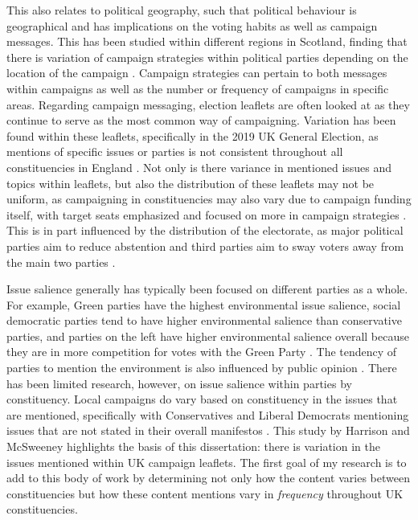 \documentclass[preprint]{elsarticle} %
\begin{document}
This also relates to political geography, such that political behaviour is geographical and has implications on the voting habits as well as campaign messages. This has been studied within different regions in Scotland, finding that there is variation of campaign strategies within political parties depending on the location of the campaign \citep{pringleClassicsHumanGeography2003,agasosterPartyCohesionLocal2001}. Campaign strategies can pertain to both messages within campaigns as well as the number or frequency of campaigns in specific areas. Regarding campaign messaging, election leaflets are often looked at as they continue to serve as the most common way of campaigning. Variation has been found within these leaflets, specifically in the 2019 UK General Election, as mentions of specific issues or parties is not consistent throughout all constituencies in England  \citep{trummParliamentaryCandidatesTheir2023a}. Not only is there variance in mentioned issues and topics within leaflets, but also the distribution of these leaflets may not be uniform, as campaigning in constituencies may also vary due to campaign funding itself, with target seats emphasized and focused on more in campaign strategies \citep{pattieResourcingConstituencyCampaign2016}. This is in part influenced by the distribution of the electorate, as major political parties aim to reduce abstention and third parties aim to sway voters away from the main two parties \citep{nunezEffectsLocalCampaigning2021}.

Issue salience generally has typically been focused on different parties as a whole. For example, Green parties have the highest environmental issue salience, social democratic parties tend to have higher environmental salience than conservative parties, and parties on the left have higher environmental salience overall because they are in more competition for votes with the Green Party \citep{carterGreeningMainstreamParty2013}. The tendency of parties to mention the environment is also influenced by public opinion \citep{carterPartyPoliticizationEnvironment2006}. There has been limited research, however, on issue salience within parties by constituency. Local campaigns do vary based on constituency in the issues that are mentioned, specifically with Conservatives and Liberal Democrats mentioning issues that are not stated in their overall manifestos \citep{harrisonNationalLocalParty2008}. This study by Harrison and McSweeney highlights the basis of this dissertation: there is variation in the issues mentioned within UK campaign leaflets. The first goal of my research is to add to this body of work by determining not only how the content varies between constituencies but how these content mentions vary in \textit{frequency} throughout UK constituencies.
\end{document}
